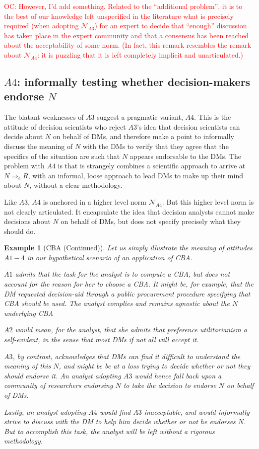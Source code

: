 \documentclass[preprint, french, english, 11pt, authoryear]{elsarticle}%
\newcommand{\protectforpdf}[1]{\texorpdfstring{\ensuremath{#1}}{#1}}
\newtheorem{example}{Example}
\newcommand{\commentOC}[1]{\textcolor{red}{OC: #1}}
\begin{document}
\commentOC{However, I’d add something. Related to the “additional problem”, it is to the best of our knowledge left unspecified in the literature what is precisely required (when adopting  $\mathscr{N}_{A3}$) for an expert to decide that “enough” discussion has taken place in the expert community and that a consensus has been reached about the acceptability of some norm. 
(In fact, this remark resembles the remark about $\mathscr{N}_{A4}$: it is puzzling that it is left completely implicit and unarticulated.) 
}

\subsection{\protectforpdf{A4}: informally testing whether decision-makers endorse \protectforpdf{N}}
The blatant weaknesses of $A3$ suggest a pragmatic variant, $A4$. This is the attitude of decision scientists who reject $A3$'s idea that decision scientists can decide about $N$ on behalf of \acp{DM}, and therefore make a point to informally discuss the meaning of $N$ with the \acp{DM} to verify that they agree that the specifics of the situation are such that $N$ appears endorsable to the \acp{DM}. The problem with $A4$ is that is strangely combines a scientific approach to arrive at $N ⇒_c R$, with an informal, loose approach to lead \acp{DM} to make up their mind about $N$, without a clear methodology.

Like $A3$, $A4$ is anchored in a higher level norm $\mathscr{N}_{A4}$. But this higher level norm is not clearly articulated. It encapsulate the idea that decision analysts cannot make decisions about $N$ on behalf of \acp{DM}, but does not specify precisely what they should do.

\begin{example}[CBA (Continued)]
Let us simply illustrate the meaning of attitudes $A1-4$ in our hypothetical scenario of an application of CBA.

$A1$ admits that the task for the analyst is to compute a CBA, but does not account for the reason for her to choose a CBA. It might be, for example, that the \ac{DM} requested decision-aid through a public procurement procedure specifying that CBA should be used. The analyst complies and remains agnostic about the $N$ underlying CBA

$A2$ would mean, for the analyst, that she admits that preference utilitarianism a self-evident, in the sense that most \acp{DM} if not all will accept it.

$A3$, by contrast, acknowledges that \acp{DM} can find it difficult to understand the meaning of this $N$, and might be be at a loss trying to decide whether or not they should endorse it. An analyst adopting $A3$ would hence fall back upon a community of researchers endorsing $N$ to take the decision to endorse $N$ on behalf of \acp{DM}.

Lastly, an analyst adopting $A4$ would find $A3$ inacceptable, and would informally strive to discuss with the \ac{DM} to help him decide whether or not he endorses $N$. But to accomplish this task, the analyst will be left without a rigorous methodology.
\end{example}
\end{document}
